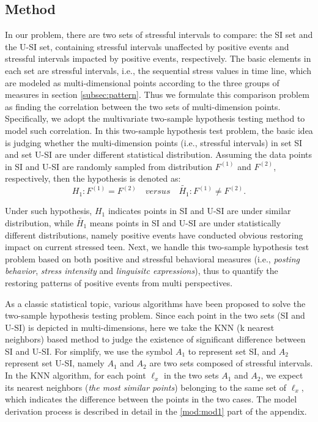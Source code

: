 \subsection{Method}
In our problem,
there are two sets of stressful intervals to compare:
the SI set and the U-SI set,
containing stressful intervals unaffected by positive events
and stressful intervals impacted by positive events, respectively.
The basic elements in each set are stressful intervals,
i.e., the sequential stress values in time line,
which are modeled as multi-dimensional points according to the three groups of measures in section \ref{subsec:pattern}.
Thus we formulate this comparison problem as finding the correlation between the two sets of multi-dimension points.
Specifically, we adopt the multivariate two-sample hypothesis testing method
\cite{Li2017Correlating,Johnson2012Applied} to model such correlation.
In this two-sample hypothesis test problem,
the basic idea is judging whether the multi-dimension points (i.e., stressful intervals)
in set SI and set U-SI are under different statistical distribution.
Assuming the data points in SI and U-SI are randomly sampled from distribution $F^{(1)}$ and $F^{(2)}$, respectively,
then the hypothesis is denoted as:
\begin{equation}
H_1: F^{(1)} =F^{(2)} \quad versus \quad \widetilde{H_1}: F^{(1)} \neq F^{(2)}.
\end{equation}

Under such hypothesis,
$H_1$ indicates points in SI and U-SI are under similar distribution,
while $\widetilde{H_1}$ means points in SI and U-SI are under statistically different distributions,
namely positive events have conducted obvious restoring impact on current stressed teen.
Next, we handle this two-sample hypothesis test problem based on both positive and stressful behavioral measures
(i.e., \emph{posting behavior}, \emph{stress intensity} and \emph{linguisitc expressions}),
thus to quantify the restoring patterns of positive events from multi perspectives.

As a classic statistical topic, various algorithms have been proposed to solve the two-sample hypothesis testing problem.
Since each point in the two sets (SI and U-SI) is depicted in multi-dimensions,
here we take the KNN (k nearest neighbors) \cite{Schilling1986Multivariate}
based method to judge the existence of significant difference between SI and U-SI.
For simplify, we use the symbol $A_1$ to represent set SI,
and $A_2$ represent set U-SI,
namely $A_1$ and $A_2$ are two sets composed of stressful intervals.
In the KNN algorithm,
for each point $\ell_{x}$ in the two sets $A_1$ and $A_2$,
we expect its nearest neighbors (\emph{the most similar points}) belonging to the same set of $\ell_x$,
which indicates the difference between the points in the two cases.
The model derivation process is described in detail in the \ref{mod:mod1} part of the appendix.


